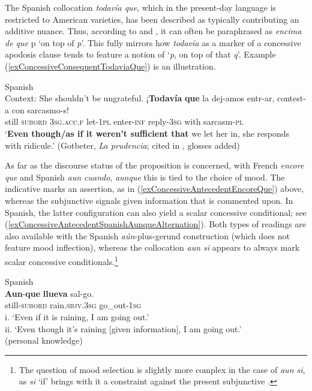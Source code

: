 The Spanish collocation \textit{todavía que}, which in the present-day language is restricted to American varieties, has been described as typically contributing an additive nuance. Thus, according to \textcite{Morera1999} and \textcite[§30.8o]{RAEGramatica}, it can often be paraphrased as \textit{encima de que} p \lq on top of \textit{p}\rq{}. This fully mirrors how \textit{todavía} as a marker of a concessive apodosis clause tends to feature a notion of \lq \textit{p}, on top of that \textit{q}\rq{}. Example (\ref{exConcessiveConsequentTodaviaQue}) is an illustration.

\begin{exe}
	\ex Spanish\label{exConcessiveConsequentTodaviaQue}\\
	Context: She shouldn't be ungrateful.
	\exi{}\gll ¡\textbf{Todavía} \textbf{que} la dej-amos entr-ar, contest-a con sarcasmo-s!\\
		\phantom{¡}still \textsc{subord} 3\textsc{sg}.\textsc{acc}.\textsc{f} let-1\textsc{pl} enter-\textsc{inf} reply-3\textsc{sg} with sarcasm-\textsc{pl}\\
	\glt \lq \textbf{Even though/as if it weren't sufficient that} we let her in, she responds with ridicule.' (Gotbeter, \textit{La prudencia}; cited in \cite[206]{Bosque2016}, glosses added)
\end{exe}

As far as the discourse status of the proposition is concerned, with French \textit{encore que} and Spanish \textit{aun cuando}, \textit{aunque} this is tied to the choice of mood. The indicative marks an assertion, as in (\ref{exConcessiveAntecedentEncoreQue}) above, whereas the subjunctive signals given information that is commented upon. In Spanish, the latter configuration can also yield a scalar concessive conditional; see (\ref{exConcessiveAntecedentSpanishAunqueAlternation}). Both types of readings are also available with the Spanish \textit{aún}-plus-gerund construction (which does not feature mood inflection), whereas the collocation \textit{aun si} appears to always mark scalar concessive conditionals.\footnote{The question of mood selection is slightly more complex in the case of \textit{aun si}, as \textit{si} \lq if\rq{ }brings with it a constraint against the present subjunctive \parencite[§47.8d]{RAEGramatica}.} 

\begin{exe}
	\ex Spanish\label{exConcessiveAntecedentSpanishAunqueAlternation}\\
\gll \textbf{Aun}-\textbf{que} \textbf{llueva} sal-go.\\
	still-\textsc{subord} rain.\textsc{sbjv}.3\textsc{sg} go\_out-1\textsc{sg}\\
	\glt i.\phantom{i} \lq Even if it is raining, I am going out.'\\
	ii. \lq Even though it's raining [given information], I am going out.'
	\\(personal knowledge)
\end{exe}

